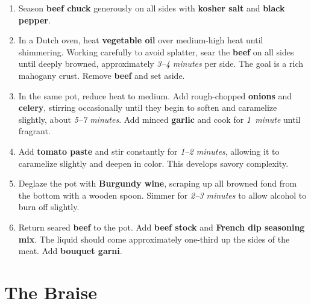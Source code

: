 \documentclass[11pt,letterpaper]{article}
\begin{document}
\begin{enumerate}
    \item Season \textbf{beef chuck} generously on all sides with \textbf{kosher salt} and \textbf{black pepper}.
    
    \item In a Dutch oven, heat \textbf{vegetable oil} over medium-high heat until shimmering. Working carefully to avoid splatter, sear the \textbf{beef} on all sides until deeply browned, approximately \textit{3--4 minutes} per side. The goal is a rich mahogany crust. Remove \textbf{beef} and set aside.
    
    \item In the same pot, reduce heat to medium. Add rough-chopped \textbf{onions} and \textbf{celery}, stirring occasionally until they begin to soften and caramelize slightly, about \textit{5--7 minutes}. Add minced \textbf{garlic} and cook for \textit{1~minute} until fragrant.
    
    \item Add \textbf{tomato paste} and stir constantly for \textit{1--2 minutes}, allowing it to caramelize slightly and deepen in color. This develops savory complexity.
    
    \item Deglaze the pot with \textbf{Burgundy wine}, scraping up all browned fond from the bottom with a wooden spoon. Simmer for \textit{2--3 minutes} to allow alcohol to burn off slightly.
    
    \item Return seared \textbf{beef} to the pot. Add \textbf{beef stock} and \textbf{French dip seasoning mix}. The liquid should come approximately one-third up the sides of the meat. Add \textbf{bouquet garni}.
\end{enumerate}

\section*{The Braise}
\end{document}
